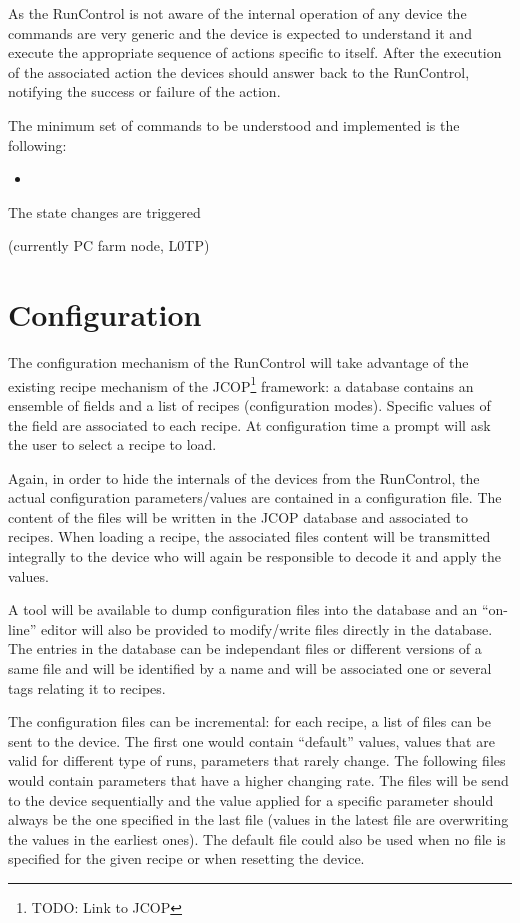 \documentclass[a4paper]{article}
\newcommand{\note}[1]{\footnote{TODO: {#1}}}
\begin{document}
As the RunControl is not aware of the internal operation of any device the commands are very generic
and the device is expected to understand it and execute the appropriate sequence of actions
specific to itself. After the execution of the associated action the devices should answer back to
the RunControl, notifying the success or failure of the action.
 

The minimum set of commands to be understood and implemented is the following:
\begin{itemize}
  \item 
\end{itemize}

The state changes are triggered


(currently PC farm node, L0TP)

\section{Configuration}
The configuration mechanism of the RunControl will take advantage of the existing recipe mechanism
of the JCOP\note{Link to JCOP} framework: a database contains an ensemble of fields and a list of
recipes (configuration modes). Specific values of the field are associated to each recipe. At
configuration time a prompt will ask the user to select a recipe to load.

Again, in order to hide the internals of the devices from the RunControl, the actual configuration
parameters/values are contained in a configuration file. The content of the files will be written in
the JCOP database and associated to recipes. When loading a recipe, the associated files content
will be transmitted integrally to the device who will again be responsible to decode it and apply
the values.

A tool will be available to dump configuration files into the database and an ``on-line'' editor will
also be provided to modify/write files directly in the database. The entries in the database can be
independant files or different versions of a same file and will be identified by a name and will
be associated one or several tags relating it to recipes.

The configuration files can be incremental: for each recipe, a list of files can be sent to the
device. The first one would contain ``default'' values, values that are valid for different type of
runs, parameters that rarely change. The following files would contain parameters that have a higher changing rate.
The files will be send to the device sequentially and the value applied for a specific parameter
should always be the one specified in the last file (values in the latest file are overwriting the
values in the earliest ones). The default file could also be used when no file is specified for the
given recipe or when resetting the device.
\end{document}
